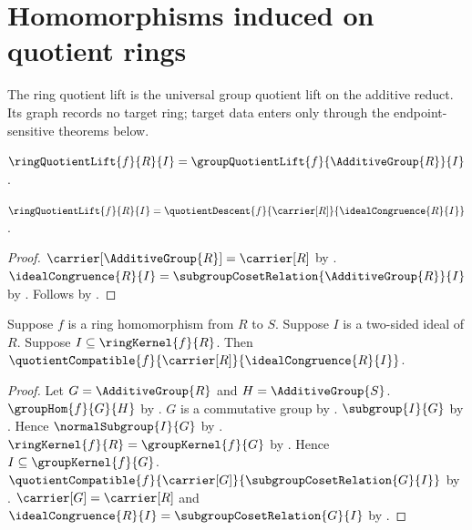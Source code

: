 


\section{Homomorphisms induced on quotient rings}

The ring quotient lift is the universal group quotient lift on the additive
reduct.  Its graph records no target ring; target data enters only through
the endpoint-sensitive theorems below.

\begin{definition}\label{ring_quotient_lift}
    $\ringQuotientLift{f}{R}{I}=
        \groupQuotientLift{f}{\AdditiveGroup{R}}{I}$.
\end{definition}

\begin{proposition}\label{ring_quotient_lift_unfold}
    $\ringQuotientLift{f}{R}{I}=
        \quotientDescent
            {f}{\carrier[R]}{\idealCongruence{R}{I}}$.
\end{proposition}
\begin{proof}
    $\carrier[\AdditiveGroup{R}]=\carrier[R]$ by
        .
    $\idealCongruence{R}{I}=
        \subgroupCosetRelation{\AdditiveGroup{R}}{I}$ by
        .
    Follows by
        .
\end{proof}

\begin{proposition}\label{ring_quotient_lift_compatible}
    Suppose $f$ is a ring homomorphism from $R$ to $S$.
    Suppose $I$ is a two-sided ideal of $R$.
    Suppose $I\subseteq\ringKernel{f}{R}$.
    Then $\quotientCompatible
        {f}{\carrier[R]}{\idealCongruence{R}{I}}$.
\end{proposition}
\begin{proof}
    Let $G=\AdditiveGroup{R}$ and $H=\AdditiveGroup{S}$.
    $\groupHom{f}{G}{H}$ by
        .
    $G$ is a commutative group by
        .
    $\subgroup{I}{G}$ by
        .
    Hence $\normalSubgroup{I}{G}$ by
        .
    $\ringKernel{f}{R}=\groupKernel{f}{G}$ by .
    Hence $I\subseteq\groupKernel{f}{G}$.
    $\quotientCompatible
        {f}{\carrier[G]}{\subgroupCosetRelation{G}{I}}$ by
        .
    $\carrier[G]=\carrier[R]$ and
        $\idealCongruence{R}{I}=\subgroupCosetRelation{G}{I}$ by
        .
\end{proof}

